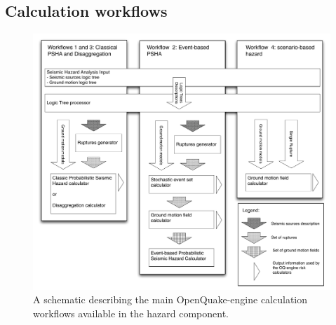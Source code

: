 \subsection{Calculation workflows}
\begin{figure}[!ht]
\centering
\includegraphics[width=14cm]{./Pictures/intro/fig02.pdf}
\caption{A schematic describing the main OpenQuake-engine calculation workflows 
available in the hazard component.}
\label{fig:oq_wf}
\end{figure}

